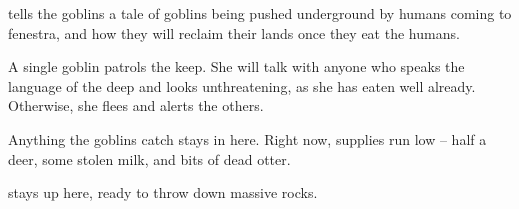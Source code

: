 \begin{multicols}{2}


 tells the goblins a tale of goblins being pushed underground by humans coming to \gls{fenestra}, and how they will reclaim their lands once they eat the humans.


\goblin


A single goblin patrols the keep.
She will talk with anyone who speaks the language of the \gls{deep} and looks unthreatening, as she has eaten well already.
Otherwise, she flees and alerts the others.



Anything the goblins catch stays in here.
Right now, supplies run low -- half a deer, some stolen milk, and bits of dead otter.


 stays up here, ready to throw down massive rocks.

 \end{multicols}


